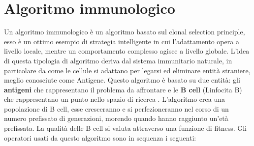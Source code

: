 \documentclass[a4paper,12pt,titlepage,oneside]{article}
\begin{document}
\section{Algoritmo immunologico}
Un algoritmo immunologico è un algoritmo basato sul clonal selection principle, esso è un ottimo esempio di strategia intelligente in cui l'adattamento opera a livello locale, mentre un comportamento complesso agisce a livello globale. L'idea di questa tipologia di algoritmo deriva dal sistema immunitario naturale, in particolare da come le cellule si adattano per legarsi ed eliminare
entità straniere, meglio conosciute come Antigene. Questo algoritmo è basato su due entità: gli \textbf{antigeni} che rappresentano il problema da affrontare e le \textbf{B cell} (Linfocita B) che rappresentano un punto nello spazio di ricerca \cite{Pavone}. L'algoritmo crea una popolazione di B cell, esse cresceranno e si perfezioneranno nel corso di un numero prefissato di generazioni, morendo quando hanno raggiunto un'età prefissata. La qualità delle B cell si valuta attraverso una funzione di fitness. Gli operatori usati da questo algoritmo sono in sequenza i seguenti:
\end{document}
